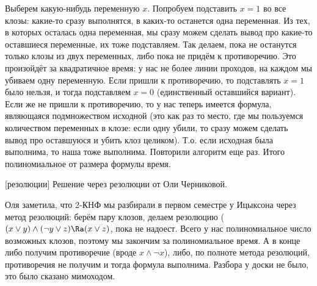 	Выберем какую-нибудь переменную $x$.
	Попробуем подставить $x=1$ во все клозы: какие-то сразу выполнятся,
	в каких-то останется одна переменная.
	Из тех, в которых осталась одна переменная, мы сразу можем сделать вывод про какие-то оставшиеся переменные,
	их тоже подставляем.
	Так делаем, пока не останутся только клозы из двух переменных, либо пока не придём
	к противоречию.
	Это произойдёт за квадратичное время: у нас не более линии проходов, на каждом мы убиваем одну переменную.
	Если пришли к противоречию, то подставлять $x=1$ было нельзя, и тогда подставляем $x=0$ (единственный оставшийся вариант).
	Если же не пришли к противоречию, то у нас теперь имеется формула, являющаяся подмножеством исходной
	(это как раз то место, где мы пользуемся количеством переменных в клозе: если одну убили, то сразу можем
	сделать вывод про оставшуюся и убить клоз целиком).
	Т.о. если исходная была выполнима, то наша тоже выполнима.
	Повторили алгоритм еще раз.
	Итого полиномиальное от размера формулы время.

[резолюции]
	Решение через резолюции от Оли Черниковой.

	Оля заметила, что 2-КНФ мы разбирали в первом семестре у Ицыксона через метод резолюций:
	берём пару клозов, делаем резолюцию ($(x \lor y) \land (\lnot y \lor z) \Ra (x \lor z)$, пока не надоест.
	Всего у нас полиномиальное число возможных клозов, поэтому мы закончим за полиномиальное время.
	А в конце либо получим противоречие (вроде $x \land \lnot x$), либо, по полноте метода резолюций,
	противоречия не получим и тогда формула выполнима.
	Разбора у доски не было, это было сказано мимоходом.

